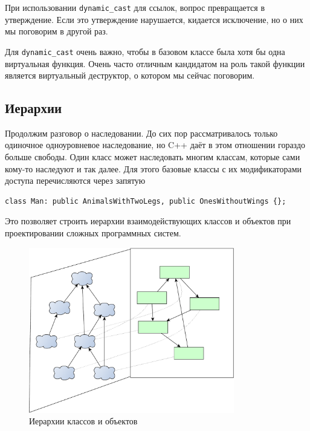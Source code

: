 \documentclass[a4paper,12pt,oneside]{article}
\begin{document}
При использовании \lstinline!dynamic_cast! для ссылок, вопрос превращается в утверждение. Если это утверждение нарушается, кидается исключение, но о них мы поговорим в другой раз.

Для \lstinline!dynamic_cast! очень важно, чтобы в базовом классе была хотя бы одна виртуальная функция. Очень часто отличным кандидатом на роль такой функции является виртуальный деструктор, о котором мы сейчас поговорим.

\subsection{Иерархии}\label{MultipleInheritance}

Продолжим разговор о наследовании. До сих пор рассматривалось только одиночное одноуровневое наследование, но C++ даёт в этом отношении гораздо больше свободы. Один класс может наследовать многим классам, которые сами кому-то наследуют и так далее. Для этого базовые классы с их модификаторами доступа перечисляются через запятую

\begin{lstlisting}
class Man: public AnimalsWithTwoLegs, public OnesWithoutWings {};
\end{lstlisting}

Это позволяет строить иерархии взаимодействующих классов и объектов при проектировании сложных программных систем.

\begin{figure}[h!]
\centering
\includegraphics[width=0.8\textwidth]{illustrations/hierarchies-crop.pdf}
\caption{Иерархии классов и объектов}
\label{fig:hierarchies-crop}
\end{figure}
\end{document}
